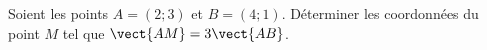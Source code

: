 
\begin{exercice}\label{exosmath-0237}

    Soient les points \(A=(2;3)\) et \( B=(4;1)\). Déterminer les coordonnées du point \( M\) tel que \( \vect{ AM }=3\vect{ AB }\).

\end{exercice}
